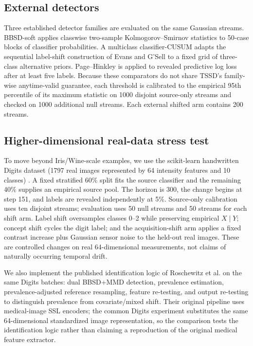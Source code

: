 \documentclass[11pt,a4paper]{article}
\theoremstyle{definition}
\newcommand{\1}{\mathbf{1}}
\begin{document}
\subsection{External detectors}
Three established detector families are evaluated on the same Gaussian streams. BBSD-soft applies classwise two-sample Kolmogorov--Smirnov statistics to 50-case blocks of classifier probabilities. A multiclass classifier-CUSUM adapts the sequential label-shift construction of Evans and G'Sell to a fixed grid of three-class alternative priors. Page--Hinkley is applied to revealed predictive log loss after at least five labels. Because these comparators do not share TSSD's family-wise anytime-valid guarantee, each threshold is calibrated to the empirical 95th percentile of its maximum statistic on 1000 disjoint source-only streams and checked on 1000 additional null streams. Each external shifted arm contains 200 streams.

\subsection{Higher-dimensional real-data stress test}
To move beyond Iris/Wine-scale examples, we use the scikit-learn handwritten Digits dataset (1797 real images represented by 64 intensity features and 10 classes) \citep{pedregosa2011}. A fixed stratified 60\% split fits the source classifier and the remaining 40\% supplies an empirical source pool. The horizon is 300, the change begins at step 151, and labels are revealed independently at 5\%. Source-only calibration uses ten disjoint streams; evaluation uses 50 null streams and 50 streams for each shift arm. Label shift oversamples classes 0--2 while preserving empirical $X\mid Y$; concept shift cycles the digit label; and the acquisition-shift arm applies a fixed contrast increase plus Gaussian sensor noise to the held-out real images. These are controlled changes on real 64-dimensional measurements, not claims of naturally occurring temporal drift.

We also implement the published identification logic of Roschewitz et al. \citep{roschewitz2025} on the same Digits batches: dual BBSD+MMD detection, prevalence estimation, prevalence-adjusted reference resampling, feature re-testing, and output re-testing to distinguish prevalence from covariate/mixed shift. Their original pipeline uses medical-image SSL encoders; the common Digits experiment substitutes the same 64-dimensional standardized image representation, so the comparison tests the identification logic rather than claiming a reproduction of the original medical feature extractor.
\end{document}

